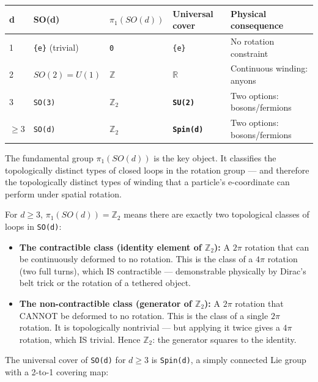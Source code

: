 \documentclass[aps,prd,preprint,superscriptaddress,longbibliography,floatfix]{revtex4-2}
\theoremstyle{remark}
\begin{document}
\begin{table}[H]
\begin{ruledtabular}
\begin{tabular}{p{3.0cm}p{3.0cm}p{3.0cm}p{3.0cm}p{3.0cm}}
d & SO(d) & $\pi_{1}(SO(d))$ & Universal cover & Physical consequence \\
\hline
1 & \texttt{\{e\}} (trivial) & \texttt{0} & \texttt{\{e\}} & No rotation constraint \\
2 & $SO(2) = U(1)$ & \textbf{\texttt{$\mathbb{Z}$}} & \textbf{\texttt{$\mathbb{R}$}} & Continuous winding: anyons \\
3 & \texttt{SO(3)} & \textbf{$\mathbb{Z}_{2}$} & \textbf{\texttt{SU(2)}} & Two options: bosons/fermions \\
$\geq 3$ & \texttt{SO(d)} & \textbf{$\mathbb{Z}_{2}$} & \textbf{\texttt{Spin(d)}} & Two options: bosons/fermions \\
\end{tabular}
\end{ruledtabular}
\end{table}

The fundamental group $\pi_{1}(SO(d))$ is the key object. It classifies the topologically distinct types of closed loops in the rotation group --- and therefore the topologically distinct types of winding that a particle's e-coordinate can perform under spatial rotation.

For $d \geq 3$, $\pi_{1}(SO(d)) = \mathbb{Z}_{2}$ means there are exactly two topological classes of loops in \texttt{SO(d)}:


\begin{itemize}
  \item \textbf{The contractible class (identity element of $\mathbb{Z}_{2}$):} A $2\pi$ rotation that can be continuously deformed to no rotation. This is the class of a $4\pi$ rotation (two full turns), which IS contractible --- demonstrable physically by Dirac's belt trick or the rotation of a tethered object.
  \item \textbf{The non-contractible class (generator of $\mathbb{Z}_{2}$):} A $2\pi$ rotation that CANNOT be deformed to no rotation. This is the class of a single $2\pi$ rotation. It is topologically nontrivial --- but applying it twice gives a $4\pi$ rotation, which IS trivial. Hence $\mathbb{Z}_{2}$: the generator squares to the identity.
\end{itemize}

The universal cover of \texttt{SO(d)} for $d \geq 3$ is \texttt{Spin(d)}, a simply connected Lie group with a 2-to-1 covering map:
\end{document}

